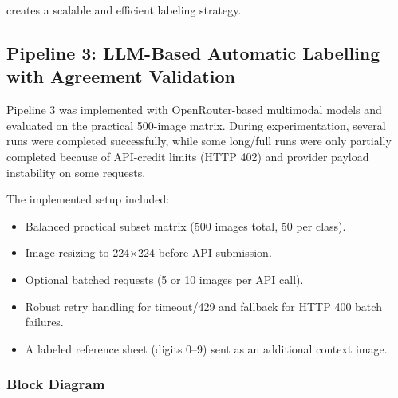 \documentclass[12pt,a4paper]{article}
\begin{document}
creates a scalable and efficient labeling strategy.

\subsection{Pipeline 3: LLM-Based Automatic Labelling with Agreement Validation}

Pipeline 3 was implemented with OpenRouter-based multimodal models and evaluated on the practical 500-image matrix. During experimentation, several runs were completed successfully, while some long/full runs were only partially completed because of API-credit limits (HTTP 402) and provider payload instability on some requests.

The implemented setup included:
\begin{itemize}
    \item Balanced practical subset matrix (500 images total, 50 per class).
    \item Image resizing to 224$\times$224 before API submission.
    \item Optional batched requests (5 or 10 images per API call).
    \item Robust retry handling for timeout/429 and fallback for HTTP 400 batch failures.
    \item A labeled reference sheet (digits 0--9) sent as an additional context image.
\end{itemize}

\subsubsection{Block Diagram}
\end{document}
